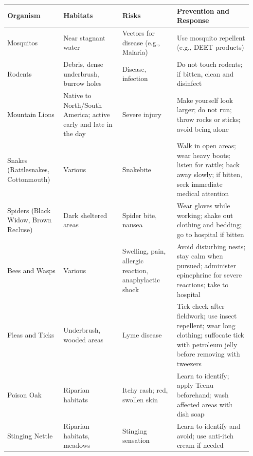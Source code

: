 \documentclass[
  11pt,
  letterpaper,
]{article}
\begin{document}
\begin{longtable}[]{@{}
  >{\raggedright\arraybackslash}p{}
  >{\raggedright\arraybackslash}p{}
  >{\raggedright\arraybackslash}p{}
  >{\raggedright\arraybackslash}p{}@{}}
\toprule\noalign{}
\begin{minipage}[b]{\linewidth}\raggedright
Organism
\end{minipage} & \begin{minipage}[b]{\linewidth}\raggedright
Habitats
\end{minipage} & \begin{minipage}[b]{\linewidth}\raggedright
Risks
\end{minipage} & \begin{minipage}[b]{\linewidth}\raggedright
Prevention and Response
\end{minipage} \\
\midrule\noalign{}
\endhead
\bottomrule\noalign{}
\endlastfoot
Mosquitos & Near stagnant water & Vectors for disease (e.g., Malaria) &
Use mosquito repellent (e.g., DEET products) \\
Rodents & Debris, dense underbrush, burrow holes & Disease, infection &
Do not touch rodents; if bitten, clean and disinfect \\
Mountain Lions & Native to North/South America; active early and late in
the day & Severe injury & Make yourself look larger; do not run; throw
rocks or sticks; avoid being alone \\
Snakes (Rattlesnakes, Cottonmouth) & Various & Snakebite & Walk in open
areas; wear heavy boots; listen for rattle; back away slowly; if bitten,
seek immediate medical attention \\
Spiders (Black Widow, Brown Recluse) & Dark sheltered areas & Spider
bite, nausea & Wear gloves while working; shake out clothing and
bedding; go to hospital if bitten \\
Bees and Wasps & Various & Swelling, pain, allergic reaction,
anaphylactic shock & Avoid disturbing nests; stay calm when pursued;
administer epinephrine for severe reactions; take to hospital \\
Fleas and Ticks & Underbrush, wooded areas & Lyme disease & Tick check
after fieldwork; use insect repellent; wear long clothing; suffocate
tick with petroleum jelly before removing with tweezers \\
Poison Oak & Riparian habitats & Itchy rash; red, swollen skin & Learn
to identify; apply Tecnu beforehand; wash affected areas with dish
soap \\
Stinging Nettle & Riparian habitats, meadows & Stinging sensation &
Learn to identify and avoid; use anti-itch cream if needed \\
\end{longtable}
\end{document}
